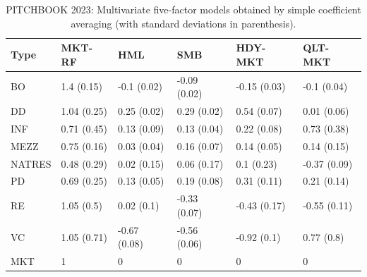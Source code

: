 \documentclass[12pt]{article}
\begin{document}
\begin{table}[ht]
	\centering
	\begin{tabular}{llllll}
		Type & MKT-RF & HML & SMB & HDY-MKT & QLT-MKT \\ 
		\hline
		\hline
		BO & 1.4 (0.15) & -0.1 (0.02) & -0.09 (0.02) & -0.15 (0.03) & -0.1 (0.04) \\ 
		DD & 1.04 (0.25) & 0.25 (0.02) & 0.29 (0.02) & 0.54 (0.07) & 0.01 (0.06) \\ 
		INF & 0.71 (0.45) & 0.13 (0.09) & 0.13 (0.04) & 0.22 (0.08) & 0.73 (0.38) \\ 
		MEZZ & 0.75 (0.16) & 0.03 (0.04) & 0.16 (0.07) & 0.14 (0.05) & 0.14 (0.15) \\ 
		NATRES & 0.48 (0.29) & 0.02 (0.15) & 0.06 (0.17) & 0.1 (0.23) & -0.37 (0.09) \\ 
		PD & 0.69 (0.25) & 0.13 (0.05) & 0.19 (0.08) & 0.31 (0.11) & 0.21 (0.14) \\ 
		RE & 1.05 (0.5) & 0.02 (0.1) & -0.33 (0.07) & -0.43 (0.17) & -0.55 (0.11) \\ 
		VC & 1.05 (0.71) & -0.67 (0.08) & -0.56 (0.06) & -0.92 (0.1) & 0.77 (0.8) \\ 
		\hline
		MKT & 1 & 0 & 0 & 0 & 0 \\ 
		\hline
		\hline
	\end{tabular}
	\caption{
	PITCHBOOK 2023: Multivariate five-factor models obtained by simple coefficient averaging (with standard deviations in parenthesis).
	} 
	\label{tab:average_coefs_2023}
\end{table}
\end{document}

